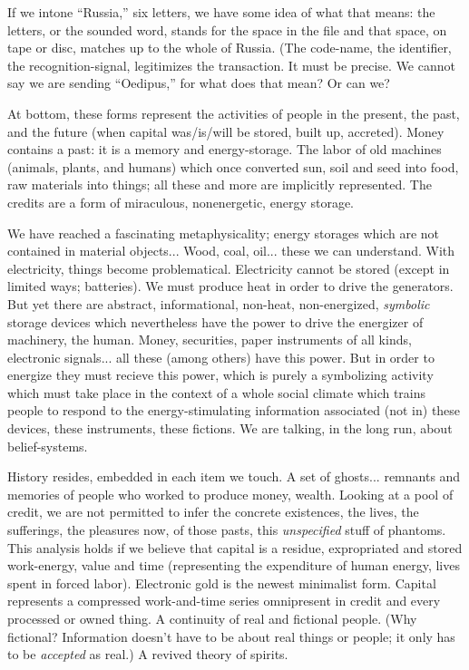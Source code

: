 If we intone \enquote{Russia,} six letters, we have some idea of what that means: the letters, or the sounded word, stands for the space in the file and that space, on tape or disc, matches up to the whole of Russia. (The code-name, the identifier, the recognition-signal, legitimizes the transaction. It must be precise. We cannot say we are sending \enquote{Oedipus,} for what does that mean? Or can we?

At bottom, these forms represent the activities of people in the present, the past, and the future (when capital was/is/will be stored, built up, accreted). Money contains a past: it is a memory and energy-storage. The labor of old machines (animals, plants, and humans) which once converted sun, soil and seed into food, raw materials into things; all these and more are implicitly represented. The credits are a form of miraculous, nonenergetic, energy storage.

We have reached a fascinating metaphysicality; energy storages which are not contained in material objects... Wood, coal, oil... these we can understand. With electricity, things become problematical. Electricity cannot be stored (except in limited ways; batteries). We must produce heat in order to drive the generators. But yet there are abstract, informational, non-heat, non-energized, \emph{symbolic} storage devices which nevertheless have the power to drive the energizer of machinery, the human. Money, securities, paper instruments of all kinds, electronic signals... all these (among others) have this power. But in order to energize they must recieve this power, which is purely a symbolizing activity which must take place in the context of a whole social climate which trains people to respond to the energy-stimulating information associated (not in) these devices, these instruments, these fictions. We are talking, in the long run, about belief-systems.

History resides, embedded in each item we touch. A set of ghosts... remnants and memories of people who worked to produce money, wealth. Looking at a pool of credit, we are not permitted to infer the concrete existences, the lives, the sufferings, the pleasures now, of those pasts, this \emph{unspecified} stuff of phantoms. This analysis holds if we believe that capital is a residue, expropriated and stored work-energy, value and time (representing the expenditure of human energy, lives spent in forced labor). Electronic gold is the newest minimalist form. Capital represents a compressed work-and-time series omnipresent in credit and every processed or owned thing. A continuity of real and fictional people. (Why fictional? Information doesn't have to be about real things or people; it only has to be \emph{accepted} as real.) A revived theory of spirits.

